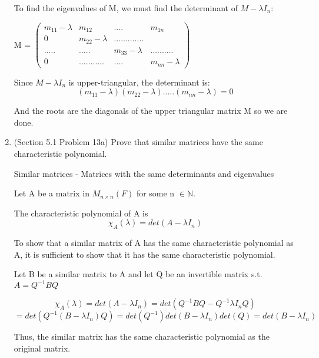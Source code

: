 \documentclass[12pt]{article}
\begin{document}
\begin{enumerate}
    To find the eigenvalues of M, we must find the determinant of $M - \lambda I_n$: 

    M = $\begin{pmatrix}
        m_{11} - \lambda & m_{12} & .... &m_{1n} \\
        0 & m_{22} - \lambda &............. \\
        .....&.....&m_{33} - \lambda&..........\\
        0 & ...........& .... &m_{nn} - \lambda
    \end{pmatrix}$

    Since $M - \lambda I_n$ is upper-triangular, the determinant is: 
    \begin{equation}
        (m_{11} - \lambda)(m_{22} - \lambda) .....(m_{nn} - \lambda) = 0
    \end{equation}

    And the roots are the diagonals of the upper triangular matrix M so we are done.

    \qedsymbol

    \item (Section 5.1 Problem 13a) Prove that similar matrices have the same characteristic polynomial.

    Similar matrices - Matrices with the same determinants and eigenvalues

    Let A be a matrix in $M_{n \times n}(F)$ for some n $\in \mathbb{N}$. 

    The characteristic polynomial of A is 
    \begin{equation}
        \chi_A(\lambda) = det(A - \lambda I_n) 
    \end{equation}

    To show that a similar matrix of A has the same characteristic polynomial as A, it is sufficient to show that it has the same characteristic polynomial. 

    Let B be a similar matrix to A and let Q be an invertible matrix s.t. $A = Q^{-1}BQ$

    \begin{equation}
        \chi_{A}(\lambda) = det(A - \lambda I_n) = det(Q^{-1}BQ - Q^{-1}\lambda I_nQ)
    \end{equation}
    \begin{equation}
        = det(Q^{-1} (B - \lambda I_n)Q) = det(Q^{-1})det(B - \lambda I_n)det(Q) = det(B - \lambda I_n)
    \end{equation}

    Thus, the similar matrix has the same characteristic polynomial as the original matrix. 
    

\end{enumerate}
\end{document}
